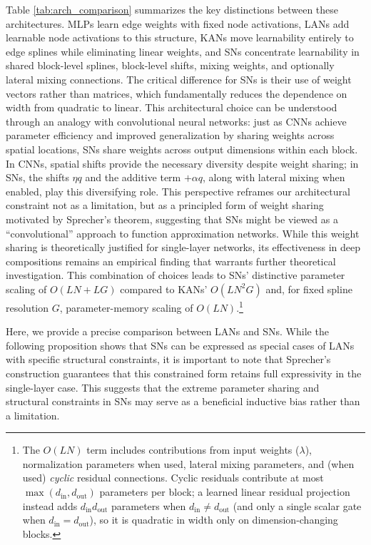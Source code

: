 \documentclass{article}
\theoremstyle{plain}
\theoremstyle{definition}
\theoremstyle{remark}
\begin{document}
Table \ref{tab:arch_comparison} summarizes the key distinctions between these architectures. MLPs learn edge weights with fixed node activations, LANs add learnable node activations to this structure, KANs move learnability entirely to edge splines while eliminating linear weights, and SNs concentrate learnability in shared block-level splines, block-level shifts, mixing weights, and optionally lateral mixing connections. The critical difference for SNs is their use of weight vectors rather than matrices, which fundamentally reduces the dependence on width from quadratic to linear. This architectural choice can be understood through an analogy with convolutional neural networks: just as CNNs achieve parameter efficiency and improved generalization by sharing weights across spatial locations, SNs share weights across output dimensions within each block. In CNNs, spatial shifts provide the necessary diversity despite weight sharing; in SNs, the shifts $\eta q$ and the additive term $+\alpha q$, along with lateral mixing when enabled, play this diversifying role. This perspective reframes our architectural constraint not as a limitation, but as a principled form of weight sharing motivated by Sprecher's theorem, suggesting that SNs might be viewed as a ``convolutional'' approach to function approximation networks. While this weight sharing is theoretically justified for single-layer networks, its effectiveness in deep compositions remains an empirical finding that warrants further theoretical investigation. This combination of choices leads to SNs' distinctive parameter scaling of $O(L N + L G)$ compared to KANs' $O(L N^2 G)$ and, for fixed spline resolution $G$, parameter-memory scaling of $O(LN)$.\footnote{The $O(LN)$ term includes contributions from input weights ($\lambda$), normalization parameters when used, lateral mixing parameters, and (when used) \emph{cyclic} residual connections. Cyclic residuals contribute at most $\max(d_{\mathrm{in}}, d_{\mathrm{out}})$ parameters per block; a learned linear residual projection instead adds $d_{\mathrm{in}}d_{\mathrm{out}}$ parameters when $d_{\mathrm{in}}\neq d_{\mathrm{out}}$ (and only a single scalar gate when $d_{\mathrm{in}}=d_{\mathrm{out}}$), so it is quadratic in width only on dimension-changing blocks.}

Here, we provide a precise comparison between LANs and SNs. While the following proposition shows that SNs can be expressed as special cases of LANs with specific structural constraints, it is important to note that Sprecher's construction guarantees that this constrained form retains full expressivity in the single-layer case. This suggests that the extreme parameter sharing and structural constraints in SNs may serve as a beneficial inductive bias rather than a limitation.
\end{document}
